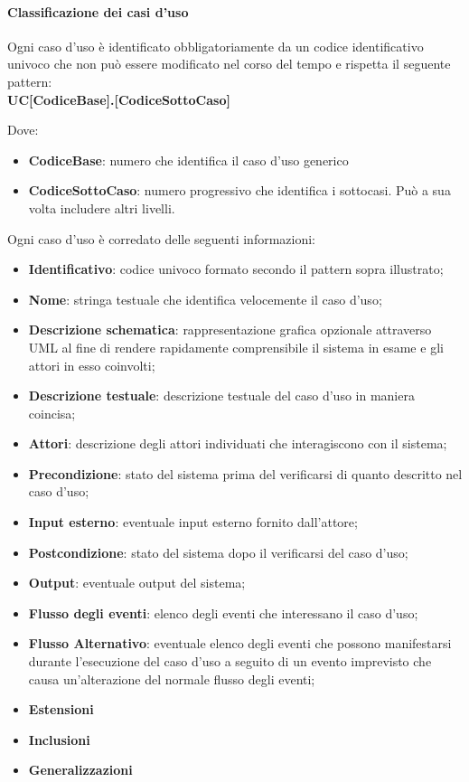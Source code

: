 \paragraph{Classificazione dei casi d'uso}
Ogni caso d'uso è identificato obbligatoriamente da un codice identificativo univoco che non può essere modificato nel corso del tempo e rispetta il seguente pattern:\\
\textbf{UC[CodiceBase].[CodiceSottoCaso]}

Dove:

\begin{itemize}
\item \textbf{CodiceBase}: numero che identifica il caso d'uso generico
\item \textbf{CodiceSottoCaso}: numero progressivo che identifica i sottocasi.  Può a sua volta includere altri livelli.
\end{itemize}

Ogni caso d'uso è corredato delle seguenti informazioni:

\begin{itemize}
\item \textbf{Identificativo}: codice univoco formato secondo il pattern sopra illustrato;
\item \textbf{Nome}: stringa testuale che identifica velocemente il caso d'uso;
\item \textbf{Descrizione schematica}: rappresentazione grafica opzionale attraverso UML al fine di rendere rapidamente comprensibile il sistema in esame e gli attori in esso coinvolti;
\item \textbf{Descrizione testuale}: descrizione testuale del caso d'uso in maniera coincisa;
\item \textbf{Attori}: descrizione degli attori individuati che interagiscono con il sistema;
\item \textbf{Precondizione}: stato del sistema prima del verificarsi di quanto descritto nel caso d'uso;
\item \textbf{Input esterno}: eventuale input esterno fornito dall'attore;
\item \textbf{Postcondizione}: stato del sistema dopo il verificarsi del caso d'uso;
\item \textbf{Output}: eventuale output del sistema;
\item \textbf{Flusso degli eventi}: elenco degli eventi che interessano il caso d'uso;
\item \textbf{Flusso Alternativo}: eventuale elenco degli eventi che possono manifestarsi durante l'esecuzione del caso d'uso a seguito di un evento imprevisto che causa un'alterazione del normale flusso degli eventi;
\item \textbf{Estensioni}
\item \textbf{Inclusioni}
\item \textbf{Generalizzazioni}
\end{itemize}

